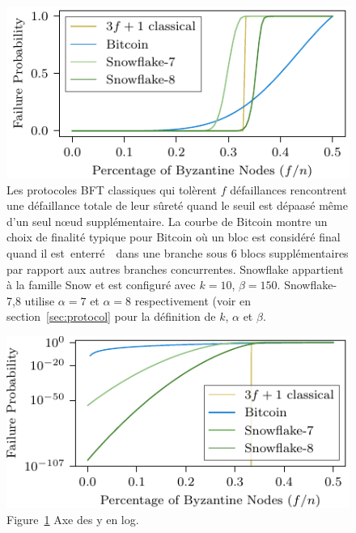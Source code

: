 \documentclass[letterpaper,twocolumn,10pt]{article}
\newcommand{\tronly}[2]{#1}
\theoremstyle{definition}
\begin{document}
\begin{figure}[h]
    \includegraphics[width=\linewidth]{figures/safety-f-eps.pdf}
    \caption{Les protocoles BFT classiques qui tolèrent $f$ défaillances rencontrent une défaillance totale de leur sûreté quand le seuil est dépaasé même d'un seul nœud supplémentaire. La courbe de Bitcoin montre un choix de finalité typique pour Bitcoin où un bloc est considéré final quand il est \guillemotleft\,enterré\,\guillemotright~ dans une branche sous 6 blocs supplémentaires par rapport aux autres branches concurrentes. Snowflake appartient à la famille Snow et est configuré avec $k=10$, $\beta=150$. Snowflake-7,8 utilise $\alpha=7$ et $\alpha=8$ respectivement (voir en section~\ref{sec:protocol} pour la définition de $k$, $\alpha$ et $\beta$.}
    \label{fig:fandepsilon}
\end{figure}

\tronly{%
\begin{figure}[h]
    \includegraphics[width=\linewidth]{figures/safety-f-eps-log.pdf}
    \caption{Figure~\ref{fig:fandepsilon} Axe des y en log.}
    \label{fig:fandepsilonlog}
\end{figure}
}{}
\end{document}
